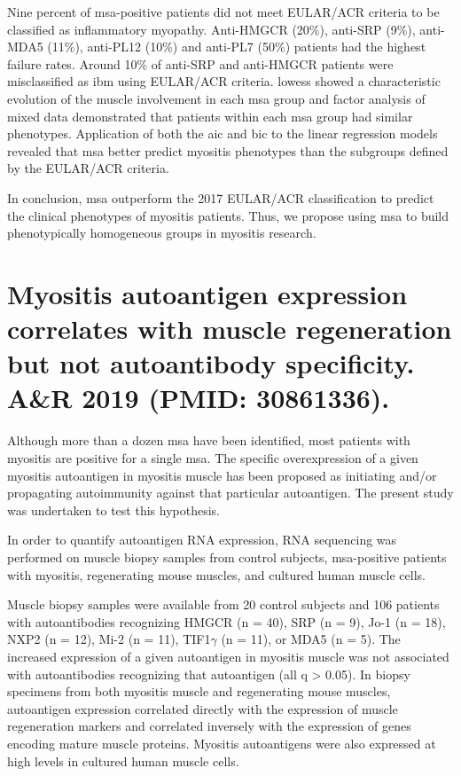 Nine percent of \gls{msa}-positive patients did not meet EULAR/ACR criteria to be classified as inflammatory myopathy. Anti-HMGCR (20\%), anti-SRP (9\%), anti-MDA5 (11\%), anti-PL12 (10\%) and anti-PL7 (50\%) patients had the highest failure rates. Around 10\% of anti-SRP and anti-HMGCR patients were misclassified as \gls{ibm} using EULAR/ACR criteria. \gls{lowess} showed a characteristic evolution of the muscle involvement in each \gls{msa} group and factor analysis of mixed data demonstrated that patients within each \gls{msa} group had similar phenotypes. Application of both the \gls{aic} and \gls{bic} to the linear regression models revealed that \gls{msa} better predict myositis phenotypes than the subgroups defined by the EULAR/ACR criteria.

In conclusion, \gls{msa} outperform the 2017 EULAR/ACR classification to predict the clinical phenotypes of myositis patients. Thus, we propose using \gls{msa} to build phenotypically homogeneous groups in myositis research.


{\cleardoublepage}

\section{Myositis autoantigen expression correlates with muscle regeneration but not autoantibody specificity. A\&R 2019 (PMID: 30861336).}
\label{sec:autoantigens}

Although more than a dozen \gls{msa} have been identified, most patients with myositis are positive for a single \gls{msa}. The specific overexpression of a given myositis autoantigen in myositis muscle has been proposed as initiating and/or propagating autoimmunity against that particular autoantigen. The present study was undertaken to test this hypothesis.

In order to quantify autoantigen RNA expression, RNA sequencing was performed on muscle biopsy samples from control subjects, \gls{msa}-positive patients with myositis, regenerating mouse muscles, and cultured human muscle cells.

Muscle biopsy samples were available from 20 control subjects and 106 patients with autoantibodies recognizing HMGCR (n = 40), SRP (n = 9), Jo-1 (n = 18), NXP2 (n = 12), Mi-2 (n = 11), TIF1$\gamma$ (n = 11), or MDA5 (n = 5). The increased expression of a given autoantigen in myositis muscle was not associated with autoantibodies recognizing that autoantigen (all q > 0.05). In biopsy specimens from both myositis muscle and regenerating mouse muscles, autoantigen expression correlated directly with the expression of muscle regeneration markers and correlated inversely with the expression of genes encoding mature muscle proteins. Myositis autoantigens were also expressed at high levels in cultured human muscle cells.

